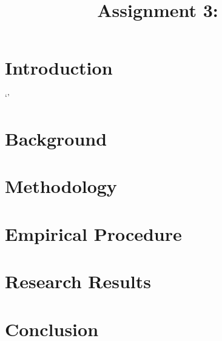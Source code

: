\documentclass[conference]{IEEEtran} %
\title{Assignment 3: }
\author{\IEEEauthorblockN{\nameinit\ \surname\ \,(\studentnumber)}
\IEEEauthorblockA{Stellenbosch University\\ Machine Learning 441\\ \emailaddr}}
\begin{document}
\maketitle

\begin{abstract}
\end{abstract}

\section{Introduction}`'

\section{Background}

\section{Methodology}

\section{Empirical Procedure}

\section{Research Results}

\section{Conclusion}

\appendices


% 
\end{document}
